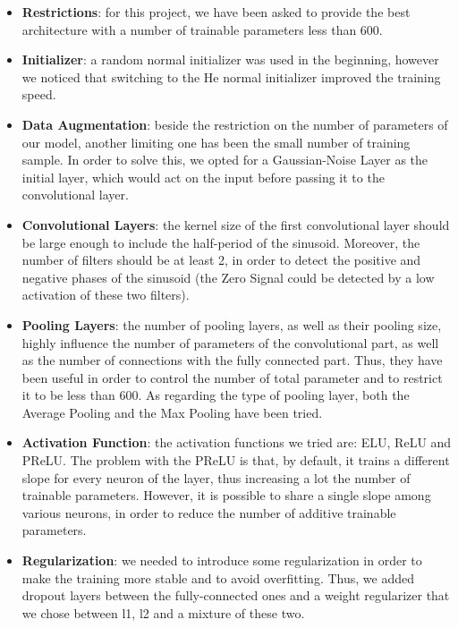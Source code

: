 \documentclass[prl, twocolumn]{revtex4-1}
\begin{document}
\begin{itemize}
    \item \textbf{Restrictions}: for this project, we have been asked to provide the best architecture with a number of trainable parameters less than 600.
    \item \textbf{Initializer}: a random normal initializer was used in the beginning, however we noticed that switching to the He normal initializer improved the training speed.
    \item \textbf{Data Augmentation}: beside the restriction on the number of parameters of our model, another limiting one has been the small number of training sample. In order to solve this, we opted for a Gaussian-Noise Layer as the initial layer, which would act on the input before passing it to the convolutional layer.
    \item \textbf{Convolutional Layers}: the kernel size of the first convolutional layer should be large enough to include the half-period of the sinusoid. Moreover, the number of filters should be at least 2, in order to detect the positive and negative phases of the sinusoid (the Zero Signal could be detected by a low activation of these two filters).
    \item \textbf{Pooling Layers}: the number of pooling layers, as well as their pooling size, highly influence the number of parameters of the convolutional part, as well as the number of connections with the fully connected part. Thus, they have been useful in order to control the number of total parameter and to restrict it to be less than 600. As regarding the type of pooling layer, both the Average Pooling and the Max Pooling have been tried.
    \item \textbf{Activation Function}: the activation functions we tried are: ELU, ReLU and PReLU. The problem with the PReLU is that, by default, it trains a different slope for every neuron of the layer, thus increasing a lot the number of trainable parameters. However, it is possible to share a single slope among various neurons, in order to reduce the number of additive trainable parameters.
    \item \textbf{Regularization}: we needed to introduce some regularization in order to make the training more stable and to avoid overfitting. Thus, we added dropout layers between the fully-connected ones and a weight regularizer that we chose between l1, l2 and a mixture of these two.
\end{itemize}

\vspace{-.2cm}
\end{document}
